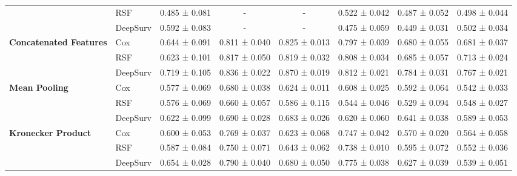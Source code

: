 \begin{sidewaystable}[htbp]
\begin{tabular}{@{}llcccccc@{}}
        & RSF & 0.485 ± 0.081 & - & - & 0.522 ± 0.042 & 0.487 ± 0.052 & 0.498 ± 0.044 \\
        & DeepSurv & 0.592 ± 0.083 & - & - & 0.475 ± 0.059 & 0.449 ± 0.031 & 0.502 ± 0.034 \\
        \midrule
        \multirow{3}{*}{\textbf{Concatenated Features}} & Cox & 0.644 ± 0.091 & 0.811 ± 0.040 & 0.825 ± 0.013 & 0.797 ± 0.039 & 0.680 ± 0.055 & 0.681 ± 0.037 \\
        & RSF & 0.623 ± 0.101 & 0.817 ± 0.050 & 0.819 ± 0.032 & 0.808 ± 0.034 & 0.685 ± 0.057 & 0.713 ± 0.024 \\
        & DeepSurv & 0.719 ± 0.105 & 0.836 ± 0.022 & 0.870 ± 0.019 & 0.812 ± 0.021 & 0.784 ± 0.031 & 0.767 ± 0.021 \\
        \midrule
        \multirow{3}{*}{\textbf{Mean Pooling}} & Cox & 0.577 ± 0.069 & 0.680 ± 0.038 & 0.624 ± 0.011 & 0.608 ± 0.025 & 0.592 ± 0.064 & 0.542 ± 0.033 \\
        & RSF & 0.576 ± 0.069 & 0.660 ± 0.057 & 0.586 ± 0.115 & 0.544 ± 0.046 & 0.529 ± 0.094 & 0.548 ± 0.027 \\
        & DeepSurv & 0.622 ± 0.099 & 0.690 ± 0.028 & 0.683 ± 0.026 & 0.620 ± 0.060 & 0.641 ± 0.038 & 0.589 ± 0.053 \\
        \midrule
        \multirow{3}{*}{\textbf{Kronecker Product}} & Cox & 0.600 ± 0.053 & 0.769 ± 0.037 & 0.623 ± 0.068 & 0.747 ± 0.042 & 0.570 ± 0.020 & 0.564 ± 0.058 \\
        & RSF & 0.587 ± 0.084 & 0.750 ± 0.071 & 0.643 ± 0.062 & 0.738 ± 0.010 & 0.595 ± 0.072 & 0.552 ± 0.036 \\
        & DeepSurv & 0.654 ± 0.028 & 0.790 ± 0.040 & 0.680 ± 0.050 & 0.775 ± 0.038 & 0.627 ± 0.039 & 0.539 ± 0.051 \\
        \bottomrule
    \end{tabular}
\end{sidewaystable}